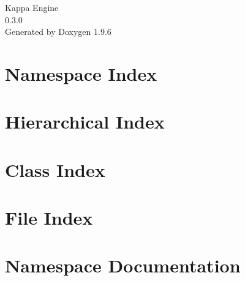 \documentclass[twoside]{book}
\newcommand{\+}{\discretionary{\mbox{\scriptsize$\hookleftarrow$}}{}{}}
\newcommand{\clearemptydoublepage}{%
    \newpage{\pagestyle{empty}\cleardoublepage}%
  }
\begin{document}
  \raggedbottom
    \hypersetup{pageanchor=false,
                bookmarksnumbered=true,
                pdfencoding=unicode
               }
  \begin{titlepage}
  \vspace*{7cm}
  \begin{center}%
  {\Large Kappa Engine}\\
  [1ex]\large 0.\+3.\+0 \\
  \vspace*{1cm}
  {\large Generated by Doxygen 1.9.6}\\
  \end{center}
  \end{titlepage}
  \clearemptydoublepage
  \tableofcontents
  \clearemptydoublepage
  \hypersetup{pageanchor=true}
\chapter{Namespace Index}

\chapter{Hierarchical Index}

\chapter{Class Index}

\chapter{File Index}

\chapter{Namespace Documentation}





\end{document}

